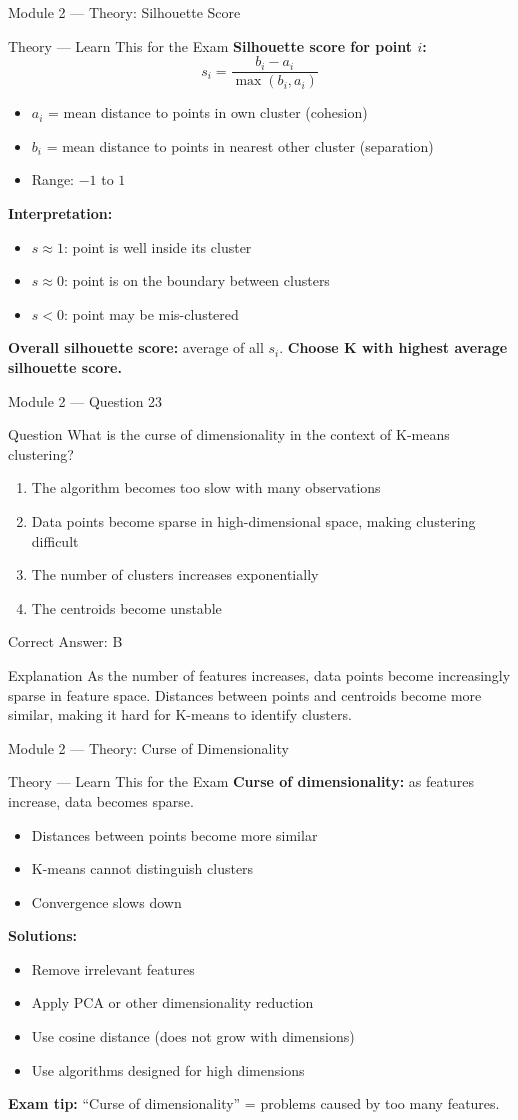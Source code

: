 \documentclass[aspectratio=169,10pt]{beamer}
\newcommand{\question}[1]{%
	\begin{block}{Question}
		#1
	\end{block}
}
\newcommand{\options}[4]{%
	\begin{enumerate}[label=\Alph*.,leftmargin=*]
		\item #1
		\item #2
		\item #3
		\item #4
	\end{enumerate}
}
\newcommand{\answerbox}[1]{%
	\begin{exampleblock}{Correct Answer: #1}
	\end{exampleblock}
}
\newcommand{\explain}[1]{%
	\begin{block}{Explanation}
		\small #1
	\end{block}
}
\newcommand{\theory}[1]{%
	\begin{block}{Theory --- Learn This for the Exam}
		\small #1
	\end{block}
}
\begin{document}
	\begin{frame}{Module 2 --- Theory: Silhouette Score}
		\theory{
			\textbf{Silhouette score for point $i$:}
			\[
			s_i = \frac{b_i - a_i}{\max(b_i, a_i)}
			\]
			\begin{itemize}
				\item $a_i$ = mean distance to points in own cluster (cohesion)
				\item $b_i$ = mean distance to points in nearest other cluster (separation)
				\item Range: $-1$ to $1$
			\end{itemize}
			\textbf{Interpretation:}
			\begin{itemize}
				\item $s \approx 1$: point is well inside its cluster
				\item $s \approx 0$: point is on the boundary between clusters
				\item $s < 0$: point may be mis-clustered
			\end{itemize}
			\textbf{Overall silhouette score:} average of all $s_i$.
			\textbf{Choose K with highest average silhouette score.}
		}
	\end{frame}
	
	\begin{frame}{Module 2 --- Question 23}
		\question{What is the curse of dimensionality in the context of K-means clustering?}
		\options{The algorithm becomes too slow with many observations}{Data points become sparse in high-dimensional space, making clustering difficult}{The number of clusters increases exponentially}{The centroids become unstable}
		\answerbox{B}
		\explain{As the number of features increases, data points become increasingly sparse in feature space. Distances between points and centroids become more similar, making it hard for K-means to identify clusters.}
	\end{frame}
	
	\begin{frame}{Module 2 --- Theory: Curse of Dimensionality}
		\theory{
			\textbf{Curse of dimensionality:} as features increase, data becomes sparse.
			\begin{itemize}
				\item Distances between points become more similar
				\item K-means cannot distinguish clusters
				\item Convergence slows down
			\end{itemize}
			\textbf{Solutions:}
			\begin{itemize}
				\item Remove irrelevant features
				\item Apply PCA or other dimensionality reduction
				\item Use cosine distance (does not grow with dimensions)
				\item Use algorithms designed for high dimensions
			\end{itemize}
			\textbf{Exam tip:} ``Curse of dimensionality'' = problems caused by too many features.
		}
	\end{frame}
	
\end{document}
